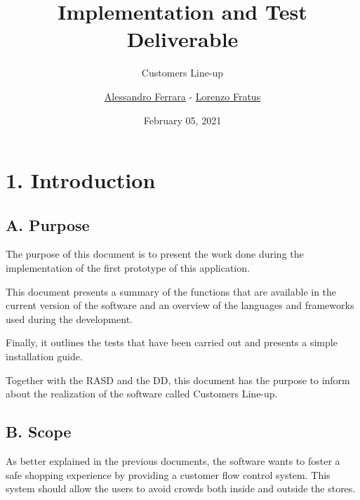 
\graphicspath{ {assets/} }
\usepackage{dirtree}

\title{Implementation and Test Deliverable}
\subtitle{Customers Line-up}
\author{\href{https://github.com/ferrohd}{Alessandro Ferrara} -
\href{https://github.com/lorenzofratus}{Lorenzo Fratus}}
\date{February 05, 2021}



\maketitle

\tableofcontents

\chapter{1. Introduction}

\section{A. Purpose}

The purpose of this document is to present the work done during the implementation of the first prototype of this application.

This document presents a summary of the functions that are available in the current version of the software and an overview of the languages and frameworks used during the development.

Finally, it outlines the tests that have been carried out and presents a simple installation guide.

Together with the RASD and the DD, this document has the purpose to inform about the realization of the software called Customers Line-up.

\section{B. Scope}

As better explained in the previous documents, the software wants to foster a safe shopping experience by providing a customer flow control system. This system should allow the users to avoid crowds both inside and outside the stores.

